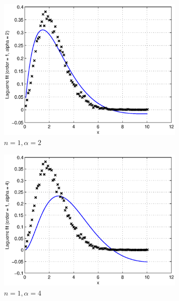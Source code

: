 \documentclass[a4paper]{article}
\numberwithin{equation}{section}
\begin{document}
\begin{figure}[!ht]	
	\centering
	\begin{subfigure}[t]{.3\textwidth}
		\centering
		\includegraphics[width=\textwidth]{lfit_order1_alpha2.eps}
		\caption{$n=1, \alpha=2$}		
	\end{subfigure}
	\quad
	\begin{subfigure}[t]{.3\textwidth}
		\centering
		\includegraphics[width=\textwidth]{lfit_order1_alpha4.eps}
		\caption{$n=1, \alpha=4$}
	\end{subfigure}
	\\
	\begin{subfigure}[t]{.3\textwidth}
			\centering

\end{subfigure}
\end{figure}
\end{document}
